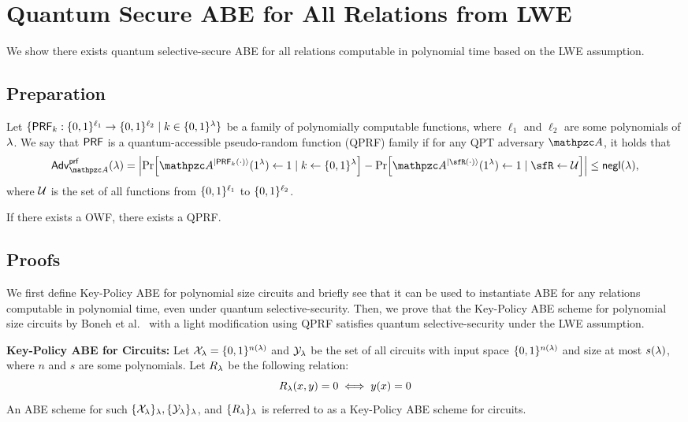 
\section{Quantum Secure ABE for All Relations from LWE}\label{sec-quantum-secure-ABE}

We show there exists quantum selective-secure ABE for all relations computable in polynomial time based on the LWE assumption.

\subsection{Preparation}

\begin{definition}\label{def:prf}
Let $\{\mathsf{PRF}_{k}: \{0,1\}^{\ell_1} \rightarrow \allowbreak \{0,1\}^{\ell_2} \mid k \in \{0,1\}^\lambda\}$ be a family of polynomially computable functions, where $\ell_1$ and $\ell_2$ are some polynomials of $\lambda$.
We say that $\mathsf{PRF}$ is a quantum-accessible pseudo-random function (QPRF) family if for any QPT adversary $\qA$, it holds that
\begin{align}
\advt{\qA}{prf}(\secp)
= \abs{\Pr[\qA^{\ket{\PRF_{k}(\cdot)}}(1^\secp) \gets 1 \mid k \gets \bit^{\secp}]
-\Pr[\qA^{\ket{\sfR(\cdot)}}(1^\secp) \gets 1 \mid \sfR \gets \cU]
}\leq\negl(\secp),
\end{align}
where $\mathcal{U}$ is the set of all functions from $\{0,1\}^{\ell_1}$ to $\{0,1\}^{\ell_2}$. 
\end{definition}

\begin{theorem}\label{thm:qprf}
If there exists a OWF, there exists a QPRF.
\end{theorem}

\subsection{Proofs}

We first define Key-Policy ABE for polynomial size circuits and briefly see that it can be used to instantiate ABE for any relations computable in polynomial time, even under quantum selective-security.  
Then, we prove that the Key-Policy ABE scheme for polynomial size circuits by Boneh et al.~\cite{EC:BGGHNS14} with a light modification using QPRF satisfies quantum selective-security under the LWE assumption.  

\textbf{Key-Policy ABE for Circuits:}
Let $\mathcal{X}_\lambda=\{0,1\}^{n(\lambda)}$ and $\mathcal{Y}_\lambda$ be the set of all circuits with input space $\{0,1\}^{n(\lambda)}$ and size at most $s(\lambda)$, where $n$ and $s$ are some polynomials.
Let $R_\lambda$ be the following relation:
$$R_\lambda(x,y)=0 \iff y(x) = 0$$
An ABE scheme for such $\{\mathcal{X}_\lambda\}_\lambda, \{\mathcal{Y}_\lambda\}_\lambda$,
and $\{R_\lambda\}_\lambda$ is referred to as a Key-Policy ABE scheme
for circuits. 

